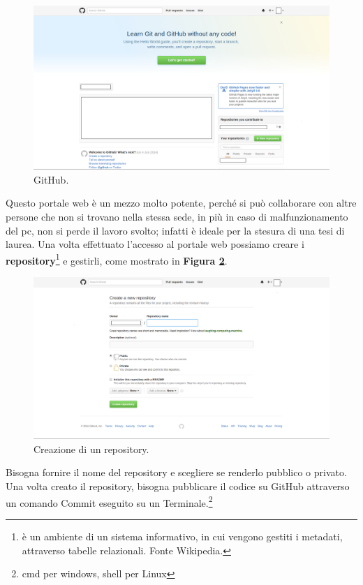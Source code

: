\documentclass[a4paper,11pt]{article}
\begin{document}
\begin{figure}[!htpb]
	\centering
	\includegraphics[scale=0.30]{github.png}
	\caption{GitHub.}
	\label{fig:12}
\end{figure}
Questo portale web è un mezzo molto potente, perché si può collaborare con altre persone che non si trovano nella stessa sede, in più in caso di malfunzionamento del pc, non si perde il lavoro svolto; infatti è ideale per la stesura di una tesi di laurea.\newline
Una volta effettuato l'accesso al portale web possiamo creare i \textbf{repository}\footnote{è un ambiente di un sistema informativo, in cui vengono gestiti i metadati, attraverso tabelle relazionali. Fonte Wikipedia.} e gestirli, come mostrato in \textbf{Figura \ref{fig:13}}.
\begin{figure}[!htpb]
	\centering
	\includegraphics[scale=0.30]{github2.png}
	\caption{Creazione di un repository.}
	\label{fig:13}
\end{figure}
\newline
Bisogna fornire il nome del repository e scegliere se renderlo pubblico o privato.
Una volta creato il repository, bisogna pubblicare il codice su GitHub attraverso un comando Commit eseguito su un Terminale.\footnote{cmd per windows, shell per Linux}
\end{document}
